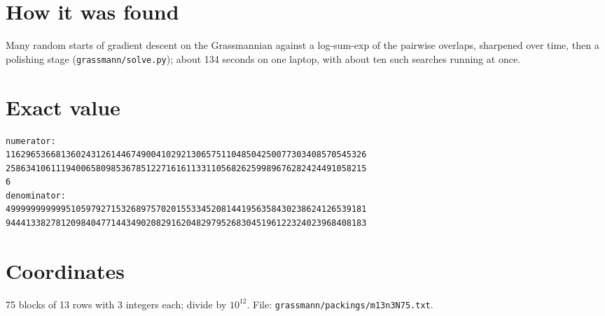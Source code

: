 \documentclass[11pt,a4paper]{article}
\begin{document}
\section{How it was found}
Many random starts of gradient descent on the Grassmannian against a log-sum-exp of the pairwise overlaps, sharpened over time, then a polishing stage (\texttt{grassmann/solve.py}); about 134 seconds on one laptop, with about ten such searches running at once.


\appendix
\section{Exact value}
{\small
\begin{verbatim}
numerator:
116296536681360243126144674900410292130657511048504250077303408570545326
258634106111940065809853678512271616113311056826259989676282424491058215
6
denominator:
499999999999510597927153268975702015533452081441956358430238624126539181
944413382781209840477144349020829162048297952683045196122324023968408183
\end{verbatim}}

\section{Coordinates}
75 blocks of 13 rows with 3 integers each; divide by $10^{12}$. File: \texttt{grassmann/packings/m13n3N75.txt}.
{\tiny
\begin{multicols}{3}
\end{multicols}}
\end{document}
